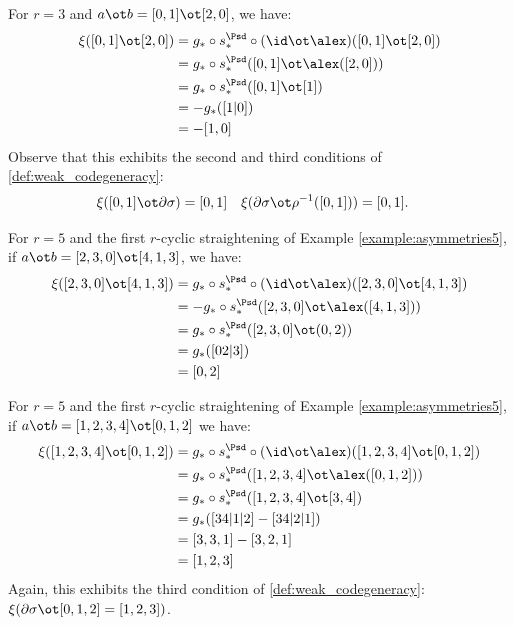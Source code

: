 \begin{example}\label{example:f3_2}
	For $r=3$ and $a \ot b = [0,1] \ot [2,0]$, we have:
	\begin{align*}
		\xi([0,1] \ot [2,0]) &= g_*\circ s_*^{\Psd}\circ (\id\ot \alex)([0,1] \ot [2,0])
		\\
		&= g_*\circ s_*^{\Psd}([0,1] \ot \alex([2,0]))
		\\
		&= g_*\circ s_*^{\Psd} ([0,1] \ot [1])
		\\
		&= -g_*([1|0])
		\\
		&= -[1,0]
	\end{align*}
	Observe that this exhibits the second and third conditions of \cref{def:weak_codegeneracy}:
	\begin{align*}
		\xi ([0,1] \ot \partial\sigma) &= [0,1]
		&
		\xi(\partial\sigma \ot \rho^{-1}([0,1])) &= [0,1].
	\end{align*}
\end{example}

\begin{example}\label{example:f5_1}
	For $r=5$ and the first $r$-cyclic straightening of Example \ref{example:asymmetries5}, if $a \ot b = [2,3,0] \ot [4,1,3]$, we have:
	\begin{align*}
		\xi([2,3,0] \ot [4,1,3]) &= g_*\circ s_*^{\Psd}\circ (\id\ot \alex)([2,3,0] \ot [4,1,3])
		\\
		&= -g_*\circ s_*^{\Psd}([2,3,0] \ot \alex([4,1,3]))
		\\
		&= g_*\circ s_*^{\Psd}([2,3,0] \ot (0,2))
		\\
		&= g_*([02|3])
		\\
		&= [0,2]
	\end{align*}
\end{example}

\begin{example}\label{example:f5_2}
	For $r=5$ and the first $r$-cyclic straightening of Example \ref{example:asymmetries5}, if $a \ot b = [1,2,3,4] \ot [0,1,2]$ we have:
	\begin{align*}
		\xi([1,2,3,4] \ot [0,1,2])
		&= g_*\circ s_*^{\Psd}\circ (\id\ot \alex)([1,2,3,4] \ot [0,1,2])
		\\
		&= g_*\circ s_*^{\Psd}([1,2,3,4] \ot \alex([0,1,2]))
		\\
		&= g_*\circ s_*^{\Psd}([1,2,3,4] \ot [3,4])
		\\
		&= g_*([34|1|2]-[34|2|1])
		\\
		&= [3,3,1] - [3,2,1]
		\\
		&= [1,2,3]
	\end{align*}
	Again, this exhibits the third condition of \cref{def:weak_codegeneracy}: $\xi(\partial\sigma \ot [0,1,2] = [1,2,3])$.
\end{example}


